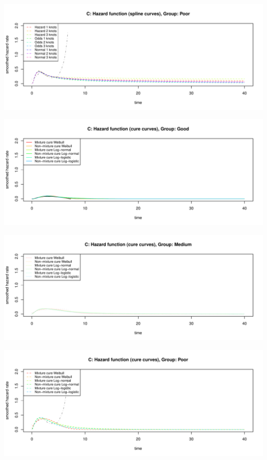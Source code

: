 \documentclass[
]{article}
\begin{document}
\begin{flushleft}\includegraphics[height=0.29\textheight]{BC_OS_output/Images/Figure_validate_extrapolation_hr-6} \end{flushleft}

\begin{flushleft}\includegraphics[height=0.29\textheight]{BC_OS_output/Images/Figure_validate_extrapolation_hr-7} \end{flushleft}

\begin{flushleft}\includegraphics[height=0.29\textheight]{BC_OS_output/Images/Figure_validate_extrapolation_hr-8} \end{flushleft}

\begin{flushleft}\includegraphics[height=0.29\textheight]{BC_OS_output/Images/Figure_validate_extrapolation_hr-9} \end{flushleft}
\end{document}
